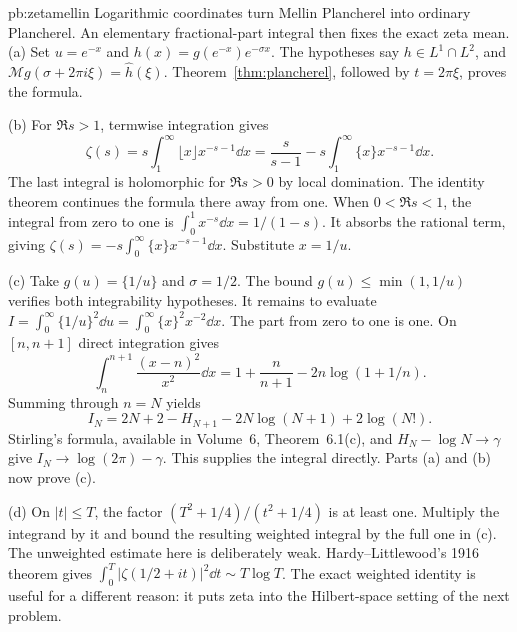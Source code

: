 \begin{solution}{pb:zetamellin}
\idea Logarithmic coordinates turn Mellin Plancherel into ordinary Plancherel. An elementary fractional-part integral then fixes the exact zeta mean.
\writeup (a) Set $u=e^{-x}$ and $h(x)=g(e^{-x})e^{-\sigma x}$. The hypotheses say $h\in L^1\cap L^2$, and $\mathcal Mg(\sigma+2\pi i\xi)=\hat h(\xi)$. Theorem~\ref{thm:plancherel}, followed by $t=2\pi\xi$, proves the formula.

(b) For $\Re s>1$, termwise integration gives
\[\zeta(s)=s\int_1^\infty\lfloor x\rfloor x^{-s-1}\dd x
 =\frac{s}{s-1}-s\int_1^\infty\{x\}x^{-s-1}\dd x.
\]
The last integral is holomorphic for $\Re s>0$ by local domination. The identity theorem continues the formula there away from one. When $0<\Re s<1$, the integral from zero to one is $\int_0^1x^{-s}\dd x=1/(1-s)$. It absorbs the rational term, giving $\zeta(s)=-s\int_0^\infty\{x\}x^{-s-1}\dd x$. Substitute $x=1/u$.

(c) Take $g(u)=\{1/u\}$ and $\sigma=1/2$. The bound $g(u)\le\min(1,1/u)$ verifies both integrability hypotheses. It remains to evaluate $I=\int_0^\infty\{1/u\}^2\dd u=\int_0^\infty\{x\}^2x^{-2}\dd x$. The part from zero to one is one. On $[n,n+1]$ direct integration gives
\[\int_n^{n+1}\frac{(x-n)^2}{x^2}\dd x
 =1+\frac n{n+1}-2n\log(1+1/n).
\]
Summing through $n=N$ yields
\[I_N=2N+2-H_{N+1}-2N\log(N+1)+2\log(N!).\]
Stirling's formula, available in Volume~6, Theorem~6.1(c), and $H_N-\log N\to\gamma$ give $I_N\to\log(2\pi)-\gamma$. This supplies the integral directly. Parts (a) and (b) now prove (c).

(d) On $|t|\le T$, the factor $(T^2+1/4)/(t^2+1/4)$ is at least one. Multiply the integrand by it and bound the resulting weighted integral by the full one in (c).
\leads The unweighted estimate here is deliberately weak. Hardy--Littlewood's 1916 theorem gives $\int_0^T|\zeta(1/2+it)|^2\dd t\sim T\log T$. The exact weighted identity is useful for a different reason: it puts zeta into the Hilbert-space setting of the next problem.
\end{solution}

